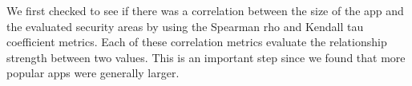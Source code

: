 \documentclass{sig-alternate}
\newcommand{\todo}[1]{\textcolor{cyan}{\textbf{[#1]}}}
\begin{document}

%
%
%
%
%
%
%
%
%
%




We first checked to see if there was a correlation between the size of the app and the evaluated security areas by using the Spearman rho and Kendall tau coefficient metrics. Each of these correlation metrics evaluate the relationship strength between two values. This is an important step since we found that more popular apps were generally larger.
\end{document}
